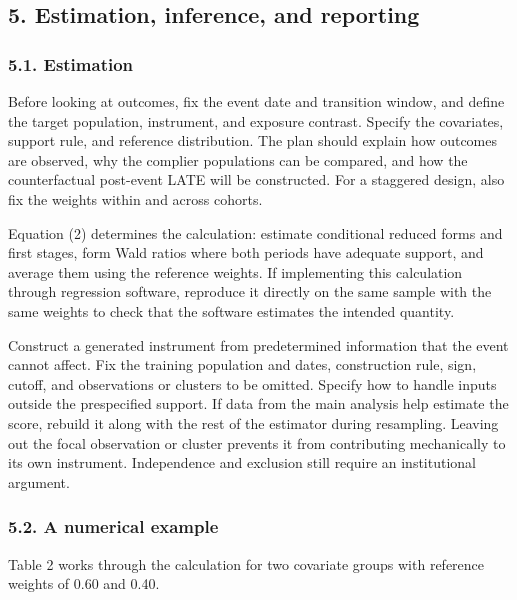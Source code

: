 \documentclass[
  11pt,
]{article}
\begin{document}
\hypertarget{estimation-inference-and-reporting}{%
\subsection{5. Estimation, inference, and
reporting}\label{estimation-inference-and-reporting}}

\hypertarget{estimation}{%
\subsubsection{5.1. Estimation}\label{estimation}}

Before looking at outcomes, fix the event date and transition window,
and define the target population, instrument, and exposure contrast.
Specify the covariates, support rule, and reference distribution. The
plan should explain how outcomes are observed, why the complier
populations can be compared, and how the counterfactual post-event LATE
will be constructed. For a staggered design, also fix the weights within
and across cohorts.

Equation (2) determines the calculation: estimate conditional reduced
forms and first stages, form Wald ratios where both periods have
adequate support, and average them using the reference weights. If
implementing this calculation through regression software, reproduce it
directly on the same sample with the same weights to check that the
software estimates the intended quantity.

Construct a generated instrument from predetermined information that the
event cannot affect. Fix the training population and dates, construction
rule, sign, cutoff, and observations or clusters to be omitted. Specify
how to handle inputs outside the prespecified support. If data from the
main analysis help estimate the score, rebuild it along with the rest of
the estimator during resampling. Leaving out the focal observation or
cluster prevents it from contributing mechanically to its own
instrument. Independence and exclusion still require an institutional
argument.

\Needspace{0.29\textheight}

\hypertarget{a-numerical-example}{%
\subsubsection{5.2. A numerical example}\label{a-numerical-example}}

Table 2 works through the calculation for two covariate groups with
reference weights of 0.60 and 0.40.
\end{document}
